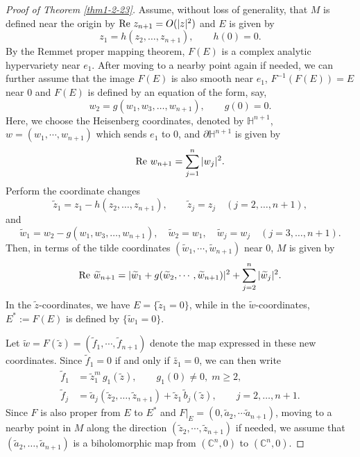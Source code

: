 \documentclass[a4paper,centertags,oneside,12pt]{amsart}
\numberwithin{equation}{section}
\begin{document}
\begin{proof}[Proof of Theorem \ref{thm1-2-23}]
Assume, without loss of  generality, that  $M$ is defined near the origin by ${\rm Re} ~z_{n+1}=O(|z|^2)$ and  \(E\) is given by
\[
z_1 = h(z_2, \dots, z_{n+1}), \qquad h(0)=0.
\]
By the Remmet proper mapping theorem, $F(E)$ is a complex analytic hypervariety near $e_1$.
After moving to a nearby point again if needed, we can further  assume that the image \(F( E)\) is also  smooth near \(e_1\), $F^{-1}(F(E))=E$ near $0$ and $F(E)$ is defined  by an equation of the form, say, 
\[
w_2 = g(w_1, w_3, \dots, w_{n+1}), \qquad g(0)=0.
\]
Here, we choose the Heisenberg coordinates, denoted by  $\mathbb H^{n+1}$,  $w=(w_1, \cdots, w_{n+1})$  which sends $e_1$ to $0$, and $\partial \mathbb H^{n+1}$ is given by 
$${\rm Re}~w_{n+1}=\sum_{j=1}^n|w_j|^2.$$
Perform the coordinate changes
\[
\widetilde z_1 = z_1 - h(z_2, \dots, z_{n+1}), \qquad 
\widetilde z_j = z_j \quad (j=2,\dots,n+1),
\]
and
\[
\widetilde w_1 = w_2 - g(w_1, w_3, \dots, w_{n+1}), \quad 
\widetilde w_2 = w_1, \quad 
\widetilde w_j = w_j \quad (j=3,\dots,n+1).
\]
Then, in terms of the tilde coordinates $(\widetilde w_1, \cdots, \widetilde w_{n+1})$ near $0$, $M$ is given by
\begin{equation}\label{tilde form of ball}
{\rm Re}~\widetilde w_{n+1}=|\widetilde w_1+g(\widetilde w_2, \cdots, \widetilde w_{n+1})|^2+\sum_{j=2}^n|\widetilde w_j|^2.
\end{equation}
In the \(\widetilde z\)-coordinates, we have \( E = \{\widetilde z_1 = 0\}\), while in the \(\widetilde w\)-coordinates, \(E^\ast:=F( E)\) is defined by  \(\{\widetilde w_1 = 0\}\).

Let \(\widetilde w=F(\widetilde z)=(\widetilde f_1,\cdots,\widetilde f_{n+1})\) denote the map expressed in these new coordinates. Since $\widetilde f_1=0$ if and only if $\widetilde{z_1}=0$, we can then write 
\[
\begin{aligned}
\widetilde f_1 &= \widetilde z_1^m \, g_1(\widetilde z), \qquad g_1(0)\neq 0, \; m\ge 2,\\[4pt]
\widetilde f_j &= \widetilde a_j(\widetilde z_2, \dots, \widetilde z_{n+1}) + \widetilde z_1 \, \widetilde b_j(\widetilde z), \qquad j=2,\dots, n+1.
\end{aligned}
\] 
Since $F$ is also proper  from  $E$ to $E^\ast$ and $F|_E=(0, \widetilde a_2, \cdots \widetilde a_{n+1})$, moving to a nearby point in $M$  along the direction $(\widetilde z_2, \cdots, \widetilde z_{n+1})$ if needed, we assume that   \((\widetilde a_2, \dots, \widetilde a_{n+1})\) is a biholomorphic map from $(\mathbb C^{n}, 0)$ to $(\mathbb C^{n}, 0)$.





\end{proof}
\end{document}
